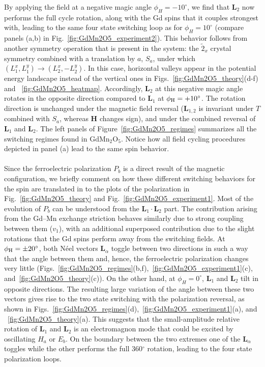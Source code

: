 By applying the field at a negative magic angle $\phi_H = -10^\circ$, we find that $\bm L_2$ now performs the full cycle rotation, along with the Gd spins that it couples strongest with, leading to the same four state switching loop as for $\phi_H = 10^\circ$ (compare panels (a,b) in Fig.~\ref{fig:GdMn2O5_experiment2}).
This behavior follows from another symmetry operation that is present in the system: the $\tilde{2}_x$ crystal symmetry combined with a translation by $a$, $S_a$, under which $(L_1^x,L_1^y) \rightarrow (L_2^x,-L_2^y)$.
In this case, horizontal valleys appear in the potential energy landscape instead of the vertical ones in Figs.~\ref{fig:GdMn2O5_theory}(d-f) and ~\ref{fig:GdMn2O5_heatmap}.
Accordingly, $\bm{L}_2$ at this negative magic angle rotates in the opposite direction compared to  $\bm{L}_1$ at $\phi_{\rm H} = +10^\circ$.
The rotation direction is unchanged under the magnetic field reversal ($\bm{L}_{1,2}$ is invariant under $T$ combined with $S_a$, whereas $\bm{H}$ changes sign), and under the combined reversal of $\bm{L}_{1}$ and $\bm{L}_{2}$.
The left panels of Figure~\ref{fig:GdMn2O5_regimes} summarizes all the switching regimes found in GdMn$_2$O$_5$.
Notice how all field cycling procedures depicted in panel (a) lead to the same spin behavior.
\\\\
%
Since the ferroelectric polarization $P_b$ is a direct result of the magnetic configuration, we briefly comment on how these different switching behaviors for the spin are translated in to the plots of the polarization in Fig.~\ref{fig:GdMn2O5_theory} and Fig.~\ref{fig:GdMn2O5_experiment1}.
Most of the evolution of $P_b$ can be understood from the $\bm L_1 \cdot \bm L_2$ part. The contribution arising from the Gd--Mn exchange striction behaves similarly due to strong coupling between them ($v_1$), with an additional superposed contribution due to the slight rotations that the Gd spins perform away from the switching fields.
At $\phi_{\rm H} = \pm 20^\circ$, both N\'eel vectors $\bm L_\alpha$ toggle between two directions in such a way that the angle between them and, hence, the ferroelectric polarization changes very little (Figs.~\ref{fig:GdMn2O5_regimes}(b,f),~\ref{fig:GdMn2O5_experiment1}(c), and~\ref{fig:GdMn2O5_theory}(c)). 
On the other hand, at $\phi_{H}=0^\circ$, $\bm{L}_1$ and  $\bm{L}_2$ tilt in opposite directions. The resulting large variation of the angle between these two vectors gives rise to the two state switching with the polarization reversal, as shown in Figs.~\ref{fig:GdMn2O5_regimes}(d),~\ref{fig:GdMn2O5_experiment1}(a), and ~\ref{fig:GdMn2O5_theory}(a). This suggests that the small-amplitude relative rotation of $\bm{L}_1$ and $\bm{L}_2$ is an electromagnon mode that could be excited by oscillating $H_a$ or $E_b$.
On the boundary between the two extremes one of the $\bm L_\alpha$ toggles while the other performs the full 360$^\circ$ rotation, leading to the four state polarization loops.
%
%
